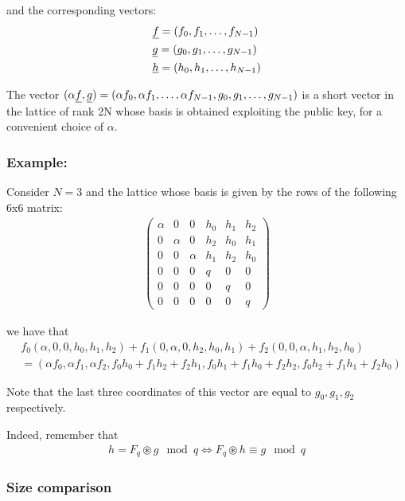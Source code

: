 \noindent
and the corresponding vectors:
\begin{align*}
    &\underline{f} = (f_0, f_1, \ldots, f_{N-1}) \\
    &\underline{g} = (g_0, g_1, \ldots, g_{N-1}) \\
    &\underline{h} = (h_0, h_1, \ldots, h_{N-1})
\end{align*}

\noindent
The vector $(\alpha \underline{f}, \underline{g}) = (\alpha f_0, \alpha f_1, \ldots, \alpha f_{N-1}, g_0, g_1, \ldots, g_{N-1})$ is a short vector in the lattice of rank 2N whose basis is obtained exploiting the public key, for a convenient choice of $\alpha$.
\medskip

\subsubsection*{Example:}
Consider $N = 3$ and the lattice whose basis is given by the rows of the following 6x6 matrix:
\begin{align*}
    \begin{pmatrix}
        \alpha & 0 & 0 & h_0 & h_1 & h_2 \\
        0 & \alpha & 0 & h_2 & h_0 & h_1 \\
        0 & 0 & \alpha & h_1 & h_2 & h_0 \\
        0 & 0 & 0 & q & 0 & 0 \\
        0 & 0 & 0 & 0 & q & 0 \\
        0 & 0 & 0 & 0 & 0 & q
    \end{pmatrix}
\end{align*}

\noindent
we have that
\begin{align*}
    &f_0(\alpha, 0, 0, h_0, h_1, h_2) + f_1(0, \alpha, 0, h_2, h_0, h_1) + f_2(0, 0, \alpha, h_1, h_2, h_0)\\
    &= (\alpha f_0, \alpha f_1, \alpha f_2, f_0 h_0 + f_1 h_2 + f_2 h_1, f_0 h_1 + f_1 h_0 + f_2 h_2, f_0 h_2 + f_1 h_1 + f_2 h_0)
\end{align*}

\noindent
Note that the last three coordinates of this vector are equal to $g_0, g_1, g_2$ respectively.
\medskip

\noindent
Indeed, remember that
\begin{align*}
    h = F_q \circledast g \mod q \iff F_q \circledast h \equiv g \mod q
\end{align*}

\subsubsection{Size comparison}

